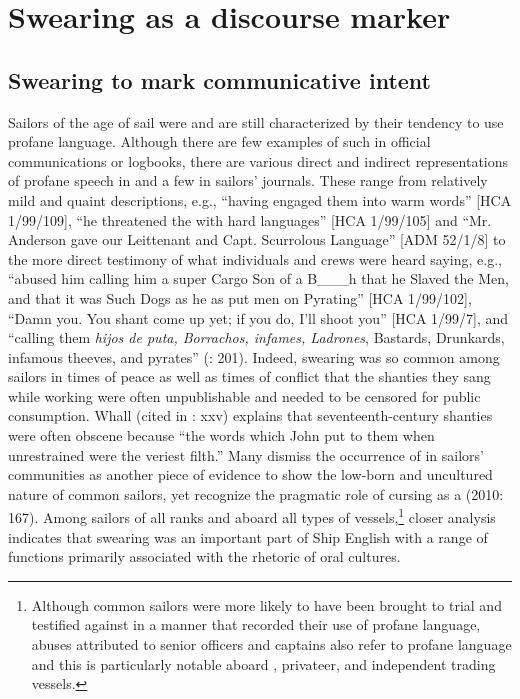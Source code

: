 \section{{Swearing as a discourse marker} }%

\subsection{{Swearing to mark communicative intent}}%

Sailors of the age of sail were and are still characterized by their tendency to use profane language. Although there are few examples of such  in official communications or logbooks, there are various direct and indirect representations of profane speech in  and a few in sailors’ journals. These range from relatively mild and quaint descriptions, e.g., “having engaged them into warm words” [HCA 1/99/109], “he threatened the  with hard languages” [HCA 1/99/105] and “Mr. Anderson gave our Leittenant and Capt. Scurrolous Language” [ADM 52/1/8] to the more direct testimony of what individuals and crews were heard saying, e.g., “abused him calling him a super Cargo Son of a B\_\_\_h that he Slaved the Men, and that it was Such Dogs as he as put men on Pyrating” [HCA 1/99/102], “Damn you. You shant come up yet; if you do, I’ll shoot you” [HCA 1/99/7], and “calling them \textit{hijos de puta, Borrachos, infames, Ladrones}, Bastards, Drunkards, infamous theeves, and pyrates” (\citealt{Gage1648}: 201). Indeed, swearing was so common among sailors in times of peace as well as times of conflict that the shanties they sang while working were often unpublishable and needed to be censored for public consumption. Whall (cited in \citealt{Palmer1986}: xxv) explains that seventeenth-century shanties were often obscene because “the words which  John put to them when unrestrained were the veriest filth.” Many dismiss the occurrence of  in sailors’ communities as another piece of evidence to show the low-born and uncultured nature of common sailors, yet \citeauthor{ClaridgeArnovick2010} recognize the pragmatic role of cursing as a  (2010: 167). Among sailors of all ranks and aboard all types of vessels,\footnote{Although common sailors were more likely to have been brought to trial and testified against in a manner that recorded their use of profane language, abuses attributed to senior officers and captains also refer to profane language and this is particularly notable aboard , privateer, and independent trading vessels.} closer analysis indicates that swearing was an important part of Ship English with a range of functions primarily associated with the rhetoric of oral cultures.

